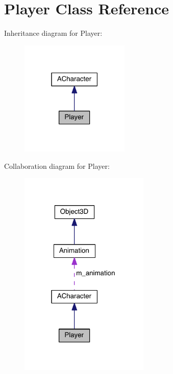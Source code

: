 \hypertarget{class_player}{}\section{Player Class Reference}
\label{class_player}


Inheritance diagram for Player\+:
\nopagebreak
\begin{figure}[H]
\begin{center}
\leavevmode
\includegraphics[width=147pt]{class_player__inherit__graph}
\end{center}
\end{figure}


Collaboration diagram for Player\+:\nopagebreak
\begin{figure}[H]
\begin{center}
\leavevmode
\includegraphics[width=175pt]{class_player__coll__graph}
\end{center}
\end{figure}
